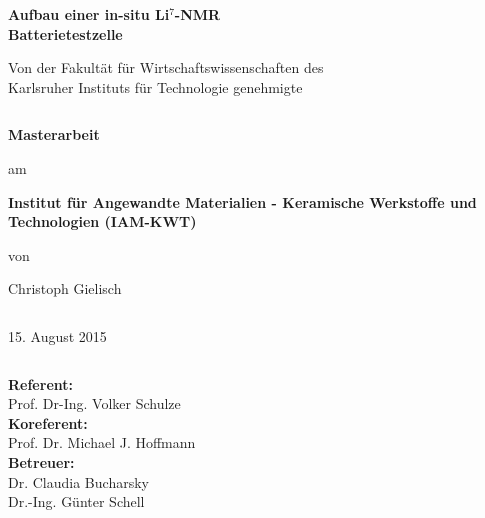 \documentclass[a4paper, 11pt, headsepline,footsepline,twoside,abstract]{scrbook}
\begin{document}
\begin{center}
\textbf{\huge{ Aufbau einer in-situ Li$^7$-NMR\\[0.4cm]Batterietestzelle}}
\end{center}
\begin{center}
\large{}
\end{center}
\begin{center}
\textbf{\Large{}}
\end{center}
\begin{center}
\large{Von der Fakultät für Wirtschaftswissenschaften des \\ Karlsruher Instituts für Technologie genehmigte }
\end{center}
\begin{verbatim}

\end{verbatim}
\begin{center}
\textbf{\LARGE{Masterarbeit}}
\end{center}
\begin{center}
am
\end{center}
\begin{center}
\textbf{\Large{Institut für Angewandte Materialien - Keramische Werkstoffe und Technologien (IAM-KWT)}}
\end{center}
\begin{center}
von
\end{center}
\begin{center}
\Large{Christoph Gielisch}
\end{center}
\begin{verbatim}

\end{verbatim}
\begin{center}
15. August 2015
\end{center}
\begin{verbatim}

\end{verbatim}
\begin{center}
\textbf{Referent:} \\ Prof. Dr-Ing. Volker Schulze \\
\textbf{Koreferent:} \\ Prof. Dr. Michael J. Hoffmann\\
\textbf{Betreuer:} \\ Dr. Claudia Bucharsky \\ 
Dr.-Ing. Günter Schell \\
\end{center}
\newpage
\cleardoubleemptypage
\end{document}
